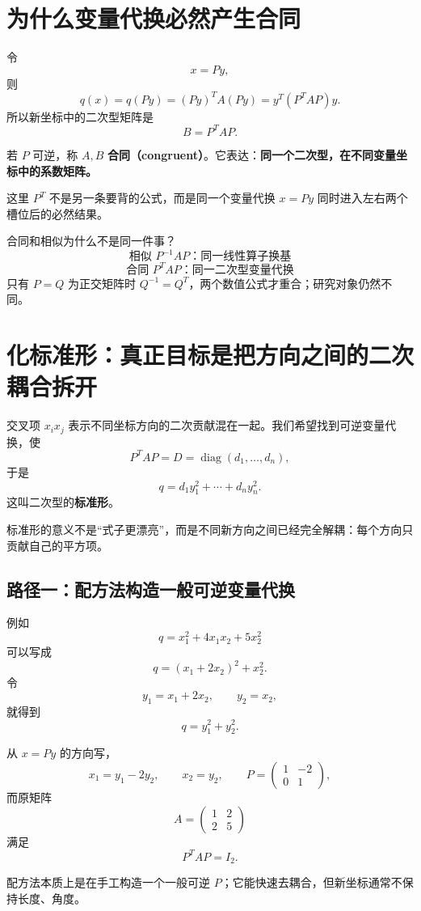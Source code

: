 \documentclass[11pt,a4paper]{ctexart}
\newcommand{\kw}[1]{\textbf{\color{deep}#1}}
\begin{document}
\section{为什么变量代换必然产生合同}

令
\[
x=Py,
\]
则
\[
q(x)=q(Py)
=(Py)^TA(Py)
=y^T(P^TAP)y.
\]
所以新坐标中的二次型矩阵是
\[
\boxed{B=P^TAP.}
\]

若 $P$ 可逆，称 $A,B$ \kw{合同（congruent）}。它表达：\kw{同一个二次型，在不同变量坐标中的系数矩阵。}

这里 $P^T$ 不是另一条要背的公式，而是同一个变量代换 $x=Py$ 同时进入左右两个槽位后的必然结果。

\begin{corebox}{合同和相似为什么不是同一件事？}
\[
\boxed{\text{相似 }P^{-1}AP\text{：同一线性算子换基}}
\]
\[
\boxed{\text{合同 }P^TAP\text{：同一二次型变量代换}}
\]
只有 $P=Q$ 为正交矩阵时 $Q^{-1}=Q^T$，两个数值公式才重合；研究对象仍然不同。
\end{corebox}

\section{化标准形：真正目标是把方向之间的二次耦合拆开}

交叉项 $x_ix_j$ 表示不同坐标方向的二次贡献混在一起。我们希望找到可逆变量代换，使
\[
P^TAP=D=\operatorname{diag}(d_1,\dots,d_n),
\]
于是
\[
q=d_1y_1^2+\cdots+d_ny_n^2.
\]
这叫二次型的\kw{标准形}。

标准形的意义不是“式子更漂亮”，而是不同新方向之间已经完全解耦：每个方向只贡献自己的平方项。

\subsection{路径一：配方法构造一般可逆变量代换}

例如
\[
q=x_1^2+4x_1x_2+5x_2^2
\]
可以写成
\[
q=(x_1+2x_2)^2+x_2^2.
\]
令
\[
y_1=x_1+2x_2,
\qquad y_2=x_2,
\]
就得到
\[
q=y_1^2+y_2^2.
\]

从 $x=Py$ 的方向写，
\[
x_1=y_1-2y_2,
\qquad x_2=y_2,
\qquad
P=\begin{pmatrix}1&-2\\0&1\end{pmatrix},
\]
而原矩阵
\[
A=\begin{pmatrix}1&2\\2&5\end{pmatrix}
\]
满足
\[
P^TAP=I_2.
\]

配方法本质上是在手工构造一个一般可逆 $P$；它能快速去耦合，但新坐标通常不保持长度、角度。
\end{document}
